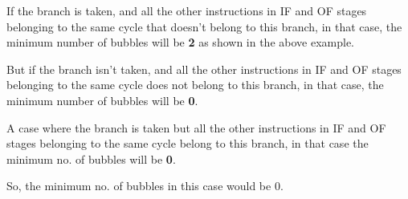 \documentclass[12pt]{article}
\begin{document}
If the branch is taken, and all the other instructions in IF and OF stages belonging to the same cycle that doesn't belong to this branch, in that case, the minimum number of bubbles will be \textbf{2} as shown in the above example. 

But if the branch isn't taken, and all the other instructions in IF
and OF stages belonging to the same cycle does not belong to this branch, in that case, the minimum number of bubbles will be \textbf{0}.


A case where the branch is taken but all the other instructions in IF and OF
stages belonging to the same cycle belong to this branch, in that case the minimum no. of bubbles will be \textbf{0}.

So, the minimum no. of bubbles in this case would be 0.

\begin{table}[]
    \begin{center}
        

\end{center}
\end{table}
\end{document}
